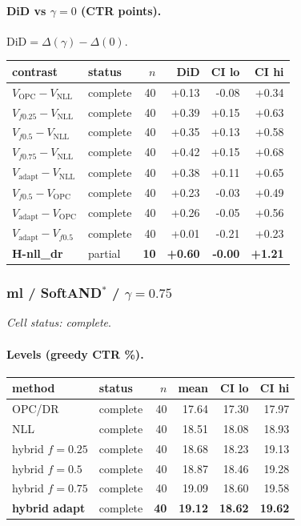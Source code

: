 \documentclass[10pt,a4paper]{article}
\begin{document}
\paragraph{DiD vs $\gamma=0$ (CTR points).} $\mathrm{DiD}=\Delta(\gamma)-\Delta(0)$.
{\centering\small\begin{tabular}{llrrrr}
\toprule contrast & status & $n$ & DiD & CI lo & CI hi \\
\midrule
$V_{\mathrm{OPC}}-V_{\mathrm{NLL}}$ & complete & 40 & +0.13 & -0.08 & +0.34 \\
$V_{f0.25}-V_{\mathrm{NLL}}$ & complete & 40 & +0.39 & +0.15 & +0.63 \\
$V_{f0.5}-V_{\mathrm{NLL}}$ & complete & 40 & +0.35 & +0.13 & +0.58 \\
$V_{f0.75}-V_{\mathrm{NLL}}$ & complete & 40 & +0.42 & +0.15 & +0.68 \\
$V_{\mathrm{adapt}}-V_{\mathrm{NLL}}$ & complete & 40 & +0.38 & +0.11 & +0.65 \\
$V_{f0.5}-V_{\mathrm{OPC}}$ & complete & 40 & +0.23 & -0.03 & +0.49 \\
$V_{\mathrm{adapt}}-V_{\mathrm{OPC}}$ & complete & 40 & +0.26 & -0.05 & +0.56 \\
$V_{\mathrm{adapt}}-V_{f0.5}$ & complete & 40 & +0.01 & -0.21 & +0.23 \\
\textbf{H-nll\_dr} & partial & \textbf{10} & \textbf{+0.60} & \textbf{-0.00} & \textbf{+1.21} \\
\bottomrule\end{tabular}\par}
\bigskip
\subsubsection{ml / SoftAND$^*$ / $\gamma=0.75$}
\emph{Cell status: complete}.
\paragraph{Levels (greedy CTR \%).}
{\centering\small\begin{tabular}{llrrrr}
\toprule method & status & $n$ & mean & CI lo & CI hi \\
\midrule
OPC/DR & complete & 40 & 17.64 & 17.30 & 17.97 \\
NLL & complete & 40 & 18.51 & 18.08 & 18.93 \\
hybrid $f{=}0.25$ & complete & 40 & 18.68 & 18.23 & 19.13 \\
hybrid $f{=}0.5$ & complete & 40 & 18.87 & 18.46 & 19.28 \\
hybrid $f{=}0.75$ & complete & 40 & 19.09 & 18.60 & 19.58 \\
\textbf{hybrid adapt} & complete & \textbf{40} & \textbf{19.12} & \textbf{18.62} & \textbf{19.62} \\
\bottomrule\end{tabular}\par}
\end{document}
